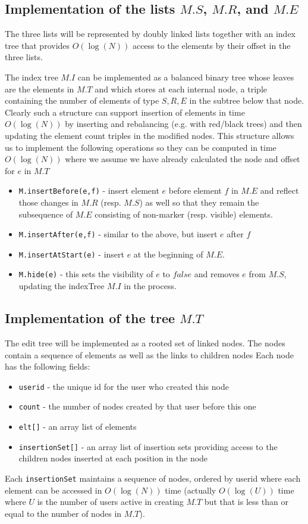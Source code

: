 \documentclass{amsart}
\begin{document}
\subsection{Implementation of the lists $M.S$, $M.R$, and $M.E$}
The three lists will be represented by doubly linked lists together with an index
tree that provides $O(\log(N))$ access to the elements by their offset in the three lists. 

The index tree $M.I$ can be implemented as a balanced binary tree whose leaves are the elements in $M.T$ and which stores at each internal node, a triple containing the number of elements of type $S,R,E$ in the subtree below that node. Clearly such a structure can support insertion of elements in time $O(\log(N))$ by inserting and rebalancing (e.g. with red/black trees) and then updating the element count triples in the modified nodes. This structure allows us to implement the following  operations so they can be computed in time $O(\log(N))$ where we assume we have already calculated the node and offset for $e$ in $M.T$
\begin{itemize}
\item {\tt M.insertBefore(e,f)} - insert element $e$ before element $f$ in $M.E$ and reflect those changes in $M.R$ (resp. $M.S$) as well so that they remain the subsequence of $M.E$ consisting of non-marker (resp. visible) elements.
\item {\tt M.insertAfter(e,f)} - similar to the above, but insert $e$ after $f$
\item {\tt M.insertAtStart(e)} - insert $e$ at the beginning of $M.E$.
\item {\tt M.hide(e)} - this sets the visibility of $e$ to $false$ and removes $e$ from $M.S$, updating the indexTree $M.I$ in the process.
\end{itemize}

\subsection{Implementation of the tree $M.T$}
The edit tree will be implemented as a rooted set of linked nodes.
The nodes contain a sequence of elements as well as the links to children nodes
Each node has the following fields:
\begin{itemize}
\item {\tt userid} - the unique id for the user who created this node
\item {\tt count} - the number of nodes created by that user before this one
\item {\tt elt[]} - an array list of elements
\item {\tt insertionSet[]} - an array list of insertion sets providing access to the children nodes inserted at each position in the node
\end{itemize}
Each {\tt insertionSet} maintains a sequence of nodes, ordered by userid where
each element can be accessed in $O(\log(N))$ time (actually $O(\log(U))$ time where $U$ is the number of users active in creating $M.T$ but that is less than or equal to the number of nodes in $M.T$).
\end{document}
